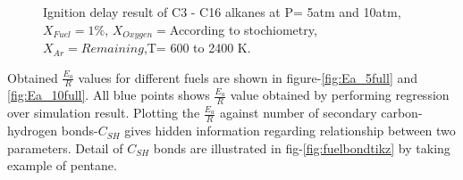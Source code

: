 \documentclass[preprint,12pt]{elsarticle}
\begin{document}
		\begin{figure}[H]\label{fig:simulationFull}
			{
			\hspace{0.25cm}
			\caption{Ignition delay result of C3 - C16 alkanes at P= 5atm and 10atm, $X_{Fuel}=1\%$, $X_{Oxygen}= $According to stochiometry, $X_{Ar}= Remaining$,T= 600 to 2400 K.}
		}
		\end{figure}
		Obtained $\frac{E_a}{R}$ values for different fuels are shown in figure-\ref{fig:Ea_5full} and \ref{fig:Ea_10full}. All blue points shows $\frac{E_a}{R}$ value obtained by performing regression over simulation result. Plotting the  $\frac{E_a}{R}$ against number of secondary carbon-hydrogen bonds-$C_{SH}$ gives hidden information regarding relationship between two parameters. Detail of $C_{SH}$ bonds are illustrated in fig-\ref{fig:fuelbondtikz} by taking example of pentane. 
		
\end{document}
